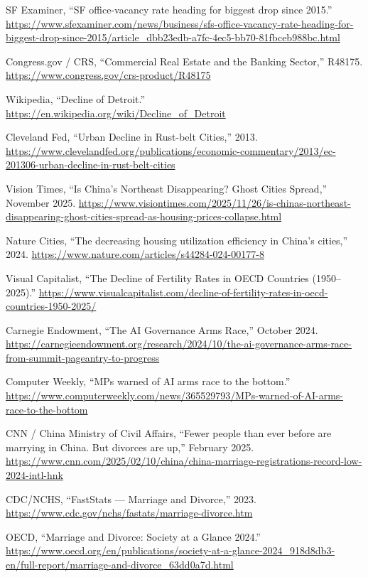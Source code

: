 \documentclass[11pt,a4paper]{article}
\begin{document}
\noindent [15] SF Examiner, ``SF office-vacancy rate heading for biggest drop since 2015.'' \url{https://www.sfexaminer.com/news/business/sfs-office-vacancy-rate-heading-for-biggest-drop-since-2015/article_dbb23edb-a7fc-4ec5-bb70-81fbceb988bc.html}

\noindent [16] Congress.gov / CRS, ``Commercial Real Estate and the Banking Sector,'' R48175. \url{https://www.congress.gov/crs-product/R48175}

\noindent [17] Wikipedia, ``Decline of Detroit.'' \url{https://en.wikipedia.org/wiki/Decline_of_Detroit}

\noindent [18] Cleveland Fed, ``Urban Decline in Rust-belt Cities,'' 2013. \url{https://www.clevelandfed.org/publications/economic-commentary/2013/ec-201306-urban-decline-in-rust-belt-cities}

\noindent [19] Vision Times, ``Is China's Northeast Disappearing? Ghost Cities Spread,'' November 2025. \url{https://www.visiontimes.com/2025/11/26/is-chinas-northeast-disappearing-ghost-cities-spread-as-housing-prices-collapse.html}

\noindent [20] Nature Cities, ``The decreasing housing utilization efficiency in China's cities,'' 2024. \url{https://www.nature.com/articles/s44284-024-00177-8}

\noindent [21] Visual Capitalist, ``The Decline of Fertility Rates in OECD Countries (1950--2025).'' \url{https://www.visualcapitalist.com/decline-of-fertility-rates-in-oecd-countries-1950-2025/}

\noindent [22] Carnegie Endowment, ``The AI Governance Arms Race,'' October 2024. \url{https://carnegieendowment.org/research/2024/10/the-ai-governance-arms-race-from-summit-pageantry-to-progress}

\noindent [23] Computer Weekly, ``MPs warned of AI arms race to the bottom.'' \url{https://www.computerweekly.com/news/365529793/MPs-warned-of-AI-arms-race-to-the-bottom}

\noindent [24] CNN / China Ministry of Civil Affairs, ``Fewer people than ever before are marrying in China. But divorces are up,'' February 2025. \url{https://www.cnn.com/2025/02/10/china/china-marriage-registrations-record-low-2024-intl-hnk}

\noindent [25] CDC/NCHS, ``FastStats --- Marriage and Divorce,'' 2023. \url{https://www.cdc.gov/nchs/fastats/marriage-divorce.htm}

\noindent [26] OECD, ``Marriage and Divorce: Society at a Glance 2024.'' \url{https://www.oecd.org/en/publications/society-at-a-glance-2024_918d8db3-en/full-report/marriage-and-divorce_63dd0a7d.html}
\end{document}

